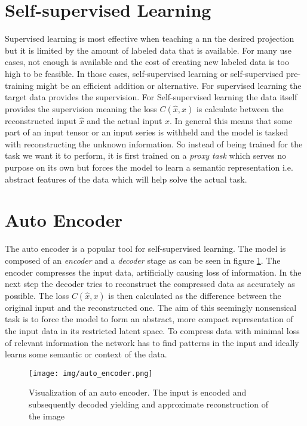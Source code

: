 \section{Self-supervised Learning}

Supervised learning is most effective when teaching a \gls{nn} the desired projection but it is limited by the amount of labeled data that is available. For many use cases, not enough is available and the cost of creating new labeled data is too high to be feasible. In those cases, self-supervised learning or self-supervised pre-training might be an efficient addition or alternative. For supervised learning the target data provides the supervision. For Self-supervised learning the data itself provides the supervision meaning the loss $C(\hat{x},x)$ is calculate between the reconstructed input $\hat{x}$ and the actual input $x$. In general this means that some part of an input tensor or an input series is withheld and the model is tasked with reconstructing the unknown information. So instead of being trained for the task we want it to perform, it is first trained on a \textit{proxy task} which serves no purpose on its own but forces the model to learn a semantic representation i.e. abstract features of the data which will help solve the actual task.

\section{Auto Encoder} \label{sec:backgrund:autoencoder}

The auto encoder is a popular tool for self-supervised learning. The model is composed of an \textit{encoder} and a \textit{decoder} stage as can be seen in figure \ref{fig:auto_encoder}. The encoder compresses the input data, artificially causing loss of information. In the next step the decoder tries to reconstruct the compressed data as accurately as possible. The loss $C(\hat{x},x)$ is then calculated as the difference between the original input and the reconstructed one. The aim of this seemingly nonsensical task is to force the model to form an abstract, more compact representation of the input data in its restricted latent space. To compress data with minimal loss of relevant information the network has to find patterns in the input and ideally learns some semantic or context of the data. 

\begin{figure}[h]
	\centering
	\texttt{[image: img/auto\_encoder.png]}
	\caption{Visualization of an auto encoder. The input is encoded and subsequently decoded yielding and approximate reconstruction of the image \cite{auto_encoders}}
	\label{fig:auto_encoder}
\end{figure}

